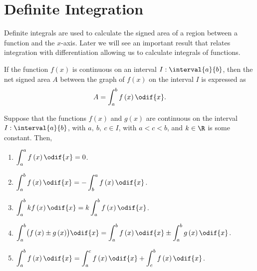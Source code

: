 \documentclass{article}
\begin{document}
\section{Definite Integration}
Definite integrals are used to calculate the signed area of a region
between a function and the \(x\)-axis. Later we will see an important
result that relates integration with differentiation allowing us to
calculate integrals of functions.
\begin{definition}
    If the function \(f\left( x \right)\) is continuous on an interval
    \(I:\interval{a}{b}\), then the net signed area \(A\) between the
    graph of \(f\left( x \right)\) on the interval \(I\) is expressed as
    \begin{equation*}
        A = \int_a^b f\left( x \right) \odif{x}.
    \end{equation*}
\end{definition}
\begin{tcolorboxlarge}[title={Properties of Definite Integrals}]
    Suppose that the functions \(f\left( x \right)\) and \(g\left( x \right)\)
    are continuous on the interval \(I:\interval{a}{b}\), with
    \(a,\:b,\:c\in I\), with \(a < c < b\), and \(k\in\R\) is some
    constant. Then,
    \begin{enumerate}[label=\normalfont\alph*)]
        \item \(\displaystyle\int_a^a f\left( x \right) \odif{x} = 0\).
        \item \(\displaystyle\int_a^b f\left( x \right) \odif{x} = -\int_b^a f\left( x \right) \odif{x}\).
        \item \(\displaystyle\int_a^b kf\left( x \right) \odif{x} = k\int_a^b f\left( x \right) \odif{x}\).
        \item \(\displaystyle\int_a^b \bigl(f\left( x \right) \pm g\left( x \right)\bigr) \odif{x} = \int_a^b f\left( x \right) \odif{x} \pm \int_a^b g\left( x \right) \odif{x}\).
        \item \(\displaystyle\int_a^b f\left( x \right) \odif{x} = \int_a^c f\left( x \right) \odif{x} + \int_c^b f\left( x \right) \odif{x}\).
    \end{enumerate}
\end{tcolorboxlarge}
\end{document}
